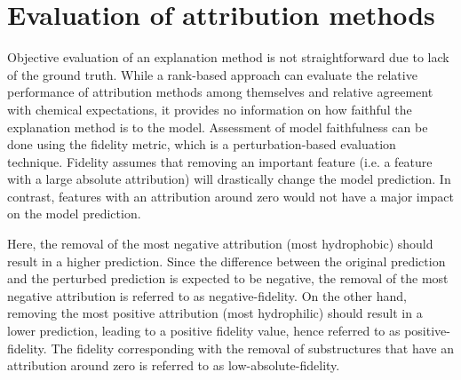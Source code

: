 \section{Evaluation of attribution methods}


Objective evaluation of an explanation method is not straightforward due to lack
of the ground truth. While a rank-based approach can evaluate the relative performance of attribution methods among 
themselves and relative agreement with chemical expectations, it provides no information on how faithful the 
explanation method is to the model. Assessment of model faithfulness can be done using the 
fidelity metric, which is a perturbation-based evaluation technique.\cite{yuan2022explainability} 
Fidelity assumes that removing an important feature (i.e. a feature with a large absolute attribution) will 
drastically change the model prediction. In contrast, features with an attribution around zero 
would not have a major impact on the model prediction.


Here, the removal of the most negative attribution (most hydrophobic) should result 
in a higher prediction. Since the difference between the original prediction and 
the perturbed prediction is expected to be negative, the removal of the most negative 
attribution is referred to as negative-fidelity. On the other hand, removing the most 
positive attribution (most hydrophilic) should result in a lower prediction, leading to a positive fidelity 
value, hence referred to as positive-fidelity. The fidelity corresponding with the removal 
of substructures that have an attribution around zero is referred to as low-absolute-fidelity.
